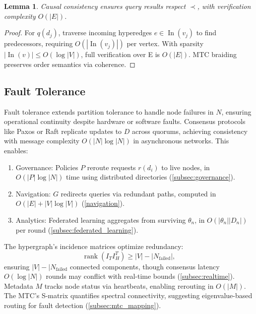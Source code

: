 \documentclass{amsart}
\newtheorem{lem}{Lemma}
\DeclareMathOperator\rank{rank}
\DeclareMathOperator\In{In}
\begin{document}
\begin{lem} \label{lem:causal_consistency}
Causal consistency ensures query results respect \( \prec \), with verification complexity \( O(|E|) \).
\end{lem}


\begin{proof}
For \( q(d_j) \), traverse incoming hyperedges \( e \in \In(v_j) \) to find predecessors, requiring \( O(|\In(v_j)|) \) per vertex. With sparsity \( |\In(v)| \leq O(\log |V|) \), full verification over E is \( O(|E|) \). MTC braiding preserves order semantics via coherence.
\end{proof}

\subsection{Fault Tolerance} \label{fault_tolerance}
Fault tolerance extends partition tolerance to handle node failures in \( N \), ensuring operational continuity despite hardware or software faults. Consensus protocols like Paxos or Raft \cite{Kleppmann2015} replicate updates to \( D \) across quorums, achieving consistency with message complexity \( O(|N| \log |N|) \) in asynchronous networks. This enables:


\begin{enumerate}
    \item Governance: Policies \( P \) reroute requests \( r(d_i) \) to live nodes, in \( O(|P| \log |N|) \) time using distributed directories (\cref{subsec:governance}).
    \item Navigation: \( G \) redirects queries via redundant paths, computed in \( O(|E| + |V| \log |V|) \) (\cref{navigation}).
    \item Analytics: Federated learning aggregates from surviving \( \theta_n \), in \( O(|\theta_n| |D_n|) \) per round (\cref{subsec:federated_learning}).
\end{enumerate}


The hypergraph's incidence matrices optimize redundancy:
\[
\rank(I_T I_H^T) \geq |V| - |N_{\text{failed}}|,
\]
ensuring \( |V| - |N_{\text{failed}} \) connected components, though consensus latency \( O(\log |N|) \) rounds may conflict with real-time bounds (\cref{subsec:realtime}). Metadata \( M \) tracks node status via heartbeats, enabling rerouting in \( O(|M|) \). The MTC's S-matrix quantifies spectral connectivity, suggesting eigenvalue-based routing for fault detection (\cref{subsec:mtc_mapping}).
\end{document}
